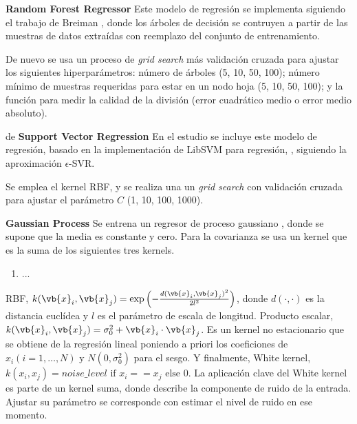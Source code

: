 \vspace{0.5cm}

\textbf{Random Forest Regressor} {} Este modelo de regresión se implementa siguiendo el trabajo de Breiman \cite{Breiman2001}, donde los árboles de decisión se contruyen a partir de las muestras de datos extraídas con reemplazo del conjunto de entrenamiento. %

De nuevo se usa un proceso de \emph{grid search} más validación cruzada para ajustar los siguientes hiperparámetros: número de árboles (5, 10, 50, 100); número mínimo de muestras requeridas para estar en un nodo hoja (5, 10, 50, 100); y la función para medir la calidad de la división (error cuadrático medio o error medio absoluto).

\vspace{0.5cm}
de
\textbf{Support Vector Regression} {} En el estudio se incluye este modelo de regresión, basado en la implementación de LibSVM para regresión, \cite{LIBSVM}, siguiendo la aproximación $\epsilon$-SVR. %

Se emplea el kernel RBF, y se realiza una un \emph{grid search} con validación cruzada para ajustar el parámetro $C$ (1, 10, 100, 1000).

\vspace{0.5cm}

\textbf{Gaussian Process} {} Se entrena un regresor de proceso gaussiano \cite{Rasmussen2006}, donde se supone que la media es constante y cero. %
Para la covarianza se usa un kernel que es la suma de los siguientes tres kernels. 
\begin{enumerate}
\item ...%
\end{enumerate}
RBF, $k(\vb{x}_i, \vb{x}_j) = \text{exp}\left(- \frac{d(\vb{x}_i, \vb{x}_j)^2}{2l^2} \right)$, donde $d(\cdot, \cdot)$ es la distancia euclídea y $l$ es el parámetro de escala de longitud. Producto escalar, $k(\vb{x}_i, \vb{x}_j) = \sigma_0 ^ 2 + \vb{x}_i \cdot \vb{x}_j$. Es un kernel no estacionario que se obtiene de la regresión lineal poniendo a priori los coeficiones de $x_i (i = 1, \ldots, N)$ y  $N(0, \sigma_0^2)$ para el sesgo. Y finalmente, White kernel, $k(x_i, x_j) = noise\_level \text{ if } x_i == x_j \text{ else } 0$. La aplicación clave del White kernel es parte de un kernel suma, donde describe la componente de ruido de la entrada. Ajustar su parámetro se corresponde con estimar el nivel de ruido en ese momento.%

